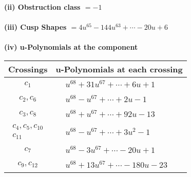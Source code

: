 \documentclass[1p]{elsarticle_modified}
\theoremstyle{definition}
\begin{document}
\flushleft \textbf{(ii) Obstruction class $= -1$}\\~\\
\flushleft \textbf{(iii) Cusp Shapes $= 4 u^{65}-144 u^{63}+\cdots-20 u+6$}\\~\\
\newpage\renewcommand{\arraystretch}{1}
\flushleft \textbf{(iv) u-Polynomials at the component}\newline \\
\begin{tabular}{m{50pt}|m{274pt}}
Crossings & \hspace{64pt}u-Polynomials at each crossing \\
\hline $$\begin{aligned}c_{1}\end{aligned}$$&$\begin{aligned}
&u^{68}+31 u^{67}+\cdots+6 u+1
\end{aligned}$\\
\hline $$\begin{aligned}c_{2},c_{6}\end{aligned}$$&$\begin{aligned}
&u^{68}- u^{67}+\cdots+2 u-1
\end{aligned}$\\
\hline $$\begin{aligned}c_{3},c_{8}\end{aligned}$$&$\begin{aligned}
&u^{68}+u^{67}+\cdots+92 u-13
\end{aligned}$\\
\hline $$\begin{aligned}c_{4},c_{5},c_{10}\\c_{11}\end{aligned}$$&$\begin{aligned}
&u^{68}- u^{67}+\cdots+3 u^2-1
\end{aligned}$\\
\hline $$\begin{aligned}c_{7}\end{aligned}$$&$\begin{aligned}
&u^{68}-3 u^{67}+\cdots-20 u+1
\end{aligned}$\\
\hline $$\begin{aligned}c_{9},c_{12}\end{aligned}$$&$\begin{aligned}
&u^{68}+13 u^{67}+\cdots-180 u-23
\end{aligned}$\\
\hline
\end{tabular}\\~\\
\end{document}

